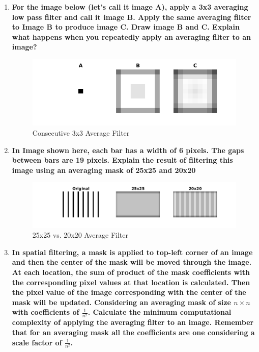 \begin{enumerate}[font=\bfseries]

    \item \textbf{For the image below (let’s call it image A), apply a 3x3
    averaging low pass filter and call it image B. Apply the same averaging
    filter to Image B to produce image C.  Draw image B and C. Explain what
    happens when you repeatedly apply an averaging filter to an image?}


    \begin{figure}[H]
	\centering
	\includegraphics[scale=0.75]{q1.png}
	\caption{Consecutive 3x3 Average Filter}
    \end{figure}

    \item \textbf{In Image shown here, each bar has a width of 6 pixels. The
    gaps between bars are 19 pixels. Explain the result of filtering this image
    using an averaging mask of 25x25 and 20x20}


    \begin{figure}[H]
	\centering
	\includegraphics[scale=0.6]{q2.png}
	\caption{25x25 vs. 20x20 Average Filter}
    \end{figure}

    \item \textbf{In spatial filtering, a mask is applied to top-left corner of
    an image and then the center of the mask will be moved through the image. At
    each location, the sum of product of the mask coefficients with the
    corresponding pixel values at that location is calculated. Then the pixel
    value of the image corresponding with the center of the mask will be
    updated. Considering an averaging mask of size $n\times n$with coefficients
    of $\frac{1}{n^2}$.  Calculate the minimum computational complexity of
    applying the averaging filter to an image.  Remember that for an averaging
    mask all the coefficients are one considering a scale factor of
    $\frac{1}{n^2}$.}



\end{enumerate}
